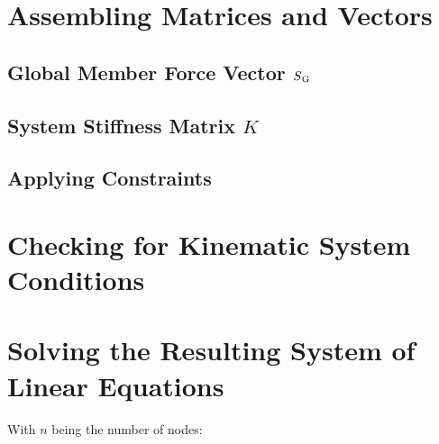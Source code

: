\section{Assembling Matrices and Vectors}
\label{sec:asmmatrvec}

\subsection{Global Member Force Vector $S\textsubscript{G}$}
\label{sec:asmSG}
\subsection{System Stiffness Matrix $K$}
\label{sec:asmK}

\subsection{Applying Constraints}
\label{sec:applyconst}


\section{Checking for Kinematic System Conditions}
\label{sec:kinesyscheck}


\section{Solving the Resulting System of Linear Equations}
\label{sec:solver}

With $n$ being the number of nodes:

